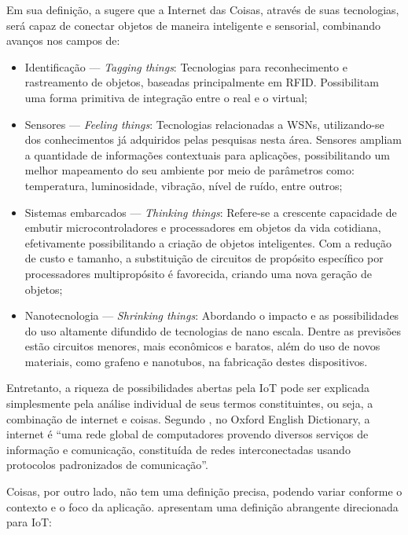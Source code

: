 \documentclass[twoside,english,brazilian]{UNISINOSmonografia}
\begin{document}
	Em sua definição, a  sugere que a Internet das 
	Coisas, através de suas tecnologias, será capaz de conectar objetos de 
	maneira inteligente e sensorial, combinando avanços nos campos de:
	\begin{itemize}
		\item Identificação --- \textit{Tagging things}: Tecnologias para 
		reconhecimento e rastreamento de objetos, baseadas principalmente 
		em RFID. Possibilitam uma forma primitiva de integração entre o 
		real e o virtual;
		
		\item Sensores --- \textit{Feeling things}: Tecnologias 
		relacionadas a WSNs, utilizando-se dos conhecimentos já adquiridos 
		pelas pesquisas nesta área. Sensores ampliam a quantidade de 
		informações contextuais para aplicações, possibilitando um melhor 
		mapeamento do seu ambiente por meio de parâmetros como: 
		temperatura, luminosidade, vibração, nível de ruído, entre outros;
		
		\item Sistemas embarcados --- \textit{Thinking things}: Refere-se 
		a crescente capacidade de embutir microcontroladores e 	
		processadores em objetos da vida cotidiana, efetivamente 
		possibilitando a criação de objetos inteligentes. Com a redução de 
		custo e tamanho, a substituição de circuitos de propósito 
		específico por processadores multipropósito é favorecida, criando 
		uma nova geração de objetos;
		
		\item Nanotecnologia --- \textit{Shrinking things}: Abordando o 
		impacto e as possibilidades do uso altamente difundido de 
		tecnologias de nano escala. Dentre as previsões estão circuitos 
		menores, mais econômicos e baratos, além do uso de novos 
		materiais, como grafeno e nanotubos, na fabricação destes 
		dispositivos.
	\end{itemize}
	
	Entretanto, a riqueza de possibilidades abertas pela IoT pode ser 
	explicada simplesmente pela análise individual de seus termos 
	constituintes, ou seja, a combinação de internet e coisas. Segundo 
	, no Oxford English Dictionary, a internet é 
	``uma rede global de computadores provendo diversos serviços de 
	informação e comunicação, constituída de redes interconectadas usando 
	protocolos padronizados de comunicação''.
	
	Coisas, por outro lado, não tem uma definição precisa, podendo variar 
	conforme o contexto e o foco da aplicação.  
	apresentam uma definição abrangente direcionada para IoT:
	
\end{document}
